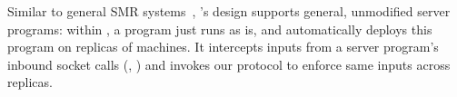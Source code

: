Similar to general SMR systems~\cite{rex:eurosys14,crane:sosp15},
\xxx's design supports general, unmodified server programs: within \xxx, a
program just runs as is, and \xxx automatically deploys this program on replicas
of machines. It intercepts inputs from a server program's inbound socket calls
(\eg, \recv) and invokes our \paxos protocol to enforce same inputs
across replicas.






%





